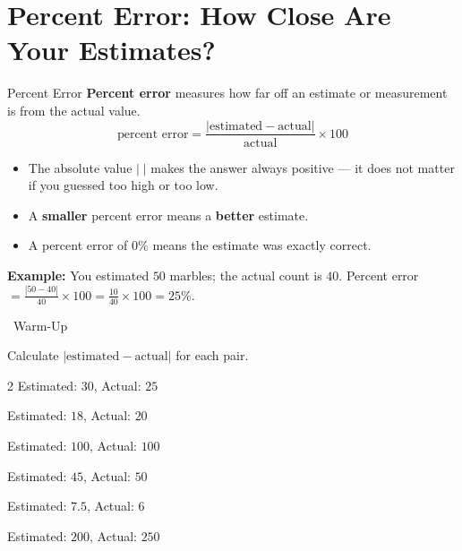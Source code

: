 \section{Percent Error: How Close Are Your Estimates?}

\begin{quickReview}{Percent Error}
\textbf{Percent error} measures how far off an estimate or measurement is from the actual value.
$$\text{percent error} = \frac{|\text{estimated} - \text{actual}|}{\text{actual}} \times 100$$

\begin{itemize}[leftmargin=*]
    \item The absolute value $| \; |$ makes the answer always positive --- it does not matter if you guessed too high or too low.
    \item A \textbf{smaller} percent error means a \textbf{better} estimate.
    \item A percent error of $0\%$ means the estimate was exactly correct.
\end{itemize}

\medskip
\textbf{Example:} You estimated $50$ marbles; the actual count is $40$. Percent error $= \frac{|50 - 40|}{40} \times 100 = \frac{10}{40} \times 100 = 25\%$.
\end{quickReview}

\begin{practiceBox}[funGreen]{\faSun~Warm-Up}

Calculate $|\text{estimated} - \text{actual}|$ for each pair.

\begin{multicols}{2}
\prob Estimated: $30$, Actual: $25$ \answerBlank[3cm]

\prob Estimated: $18$, Actual: $20$ \answerBlank[3cm]

\prob Estimated: $100$, Actual: $100$ \answerBlank[3cm]

\prob Estimated: $45$, Actual: $50$ \answerBlank[3cm]

\prob Estimated: $7.5$, Actual: $6$ \answerBlank[3cm]

\prob Estimated: $200$, Actual: $250$ \answerBlank[3cm]
\end{multicols}
\end{practiceBox}

